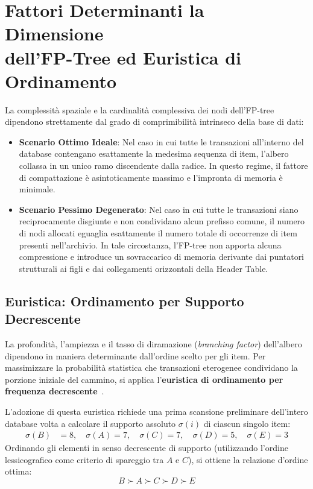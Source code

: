 \section[Dimensione dell'FP-Tree ed Euristica]{Fattori Determinanti la Dimensione\\dell'FP-Tree ed Euristica di Ordinamento}
\label{sec:dm-fp-compaction-heuristic}

La complessità spaziale e la cardinalità complessiva dei nodi dell'FP-tree dipendono strettamente dal grado di comprimibilità intrinseco della base di dati:
\begin{itemize}
    \item \textbf{Scenario Ottimo Ideale}: Nel caso in cui tutte le transazioni all'interno del database contengano esattamente la medesima sequenza di item, l'albero collassa in un unico ramo discendente dalla radice. In questo regime, il fattore di compattazione è asintoticamente massimo e l'impronta di memoria è minimale.
    \item \textbf{Scenario Pessimo Degenerato}: Nel caso in cui tutte le transazioni siano reciprocamente disgiunte e non condividano alcun prefisso comune, il numero di nodi allocati eguaglia esattamente il numero totale di occorrenze di item presenti nell'archivio. In tale circostanza, l'FP-tree non apporta alcuna compressione e introduce un sovraccarico di memoria derivante dai puntatori strutturali ai figli e dai collegamenti orizzontali della Header Table.
\end{itemize}

\FloatBarrier
\subsection{Euristica: Ordinamento per Supporto Decrescente}
\label{subsec:dm-frequency-ordering}

La profondità, l'ampiezza e il tasso di diramazione (\textit{branching factor}) dell'albero dipendono in maniera determinante dall'ordine scelto per gli item. Per massimizzare la probabilità statistica che transazioni eterogenee condividano la porzione iniziale del cammino, si applica l'\textbf{euristica di ordinamento per frequenza decrescente}~\cite{han2000, tan2018}.

L'adozione di questa euristica richiede una prima scansione preliminare dell'intero database volta a calcolare il supporto assoluto $\sigma(i)$ di ciascun singolo item:
\begin{align}
\sigma(B) &= 8, \quad \sigma(A) = 7, \quad \sigma(C) = 7, \quad \sigma(D) = 5, \quad \sigma(E) = 3
\end{align}
Ordinando gli elementi in senso decrescente di supporto (utilizzando l'ordine lessicografico come criterio di spareggio tra $A$ e $C$), si ottiene la relazione d'ordine ottima:
\begin{equation}
B \succ A \succ C \succ D \succ E
\end{equation}

